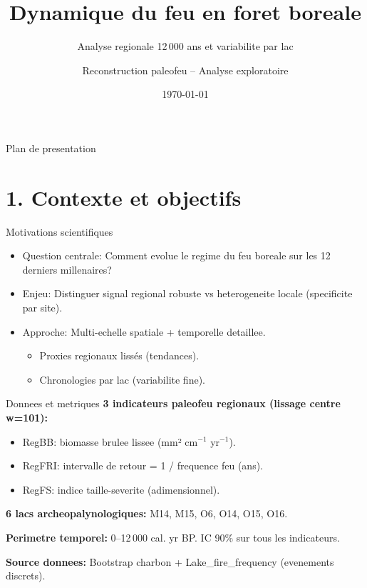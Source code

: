 \documentclass[aspectratio=169,11pt]{beamer}
\title{Dynamique du feu en foret boreale}
\subtitle{Analyse regionale 12\,000 ans et variabilite par lac}
\author{Reconstruction paleofeu -- Analyse exploratoire}
\institute{Foret Boreale}
\date{\today}
\begin{document}
\begin{frame}
  \titlepage
\end{frame}

\begin{frame}{Plan de presentation}
  \tableofcontents
\end{frame}

\section{1. Contexte et objectifs}

\begin{frame}{Motivations scientifiques}
\begin{itemize}
  \item \alert{Question centrale}: Comment evolue le regime du feu boreale sur les 12 derniers millenaires?
  
  \item \alert{Enjeu:} Distinguer signal regional robuste vs heterogeneite locale (specificite par site).
  
  \item \alert{Approche:} Multi-echelle spatiale + temporelle detaillee.
  \begin{itemize}
    \item Proxies regionaux lissés (tendances).
    \item Chronologies par lac (variabilite fine).
  \end{itemize}
\end{itemize}
\end{frame}

\begin{frame}{Donnees et metriques}
\textbf{3 indicateurs paleofeu regionaux (lissage centre w=101):}
\begin{itemize}
  \item \alert{RegBB}: biomasse brulee lissee (mm² cm$^{-1}$ yr$^{-1}$).
  \item \alert{RegFRI}: intervalle de retour = 1 / frequence feu (ans).
  \item \alert{RegFS}: indice taille-severite (adimensionnel).
\end{itemize}

\textbf{6 lacs archeopalynologiques:} M14, M15, O6, O14, O15, O16.

\textbf{Perimetre temporel:} 0--12\,000 cal. yr BP. IC 90\% sur tous les indicateurs.

\textbf{Source donnees:} Bootstrap charbon + Lake\_fire\_frequency (evenements discrets).
\end{frame}
\end{document}
